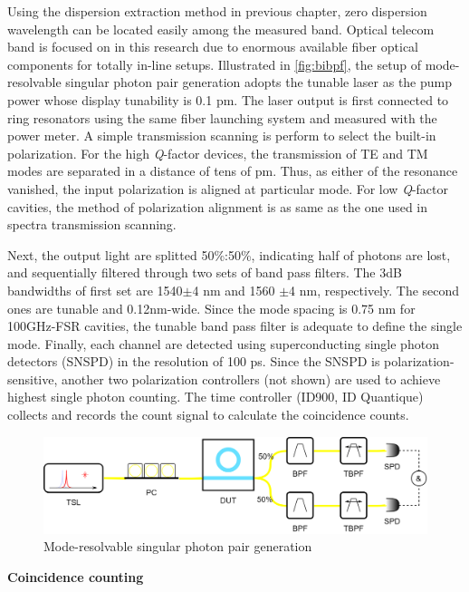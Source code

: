 Using the dispersion extraction method in previous chapter, zero dispersion wavelength can be located easily among the measured band. Optical telecom band is focused on in this research due to enormous available fiber optical components for totally in-line setups. 
Illustrated in \autoref{fig:bibpf}, the setup of mode-resolvable singular photon pair generation adopts the tunable laser as the pump power whose display tunability is 0.1 pm. The laser output is first connected to ring resonators using the same fiber launching system and measured with the power meter. A simple transmission scanning is perform to select the built-in polarization. For the high \textit{Q}-factor devices, the transmission of TE and TM modes are separated in a distance of tens of pm. Thus, as either of the resonance vanished, the input polarization is aligned at particular mode. For low \textit{Q}-factor cavities, the method of polarization alignment is as same as the one used in spectra transmission scanning.

Next, the output light are splitted 50\si{\percent}:50\si{\percent}, indicating half of photons are lost, and sequentially filtered through two sets of band pass filters. The 3dB bandwidths of first set are 1540$\pm$4 nm and 1560 $\pm$4 nm, respectively. The second ones are tunable and 0.12nm-wide. Since the mode spacing is 0.75 nm for 100GHz-FSR cavities, the tunable band pass filter is adequate to define the single mode. Finally, each channel are detected using superconducting single photon detectors (SNSPD) in the resolution of 100 ps. Since the SNSPD is polarization-sensitive, another two polarization controllers (not shown) are used to achieve highest single photon counting. The time controller (ID900, ID Quantique) collects and records the count signal to calculate the coincidence counts.

\begin{figure}
	\centering
	\includegraphics[width=0.9\linewidth]{imgs/png/biBPF}
	\caption{Mode-resolvable singular photon pair generation}
	\label{fig:bibpf}
\end{figure}

\bigskip
\noindent\textbf{Coincidence counting}

